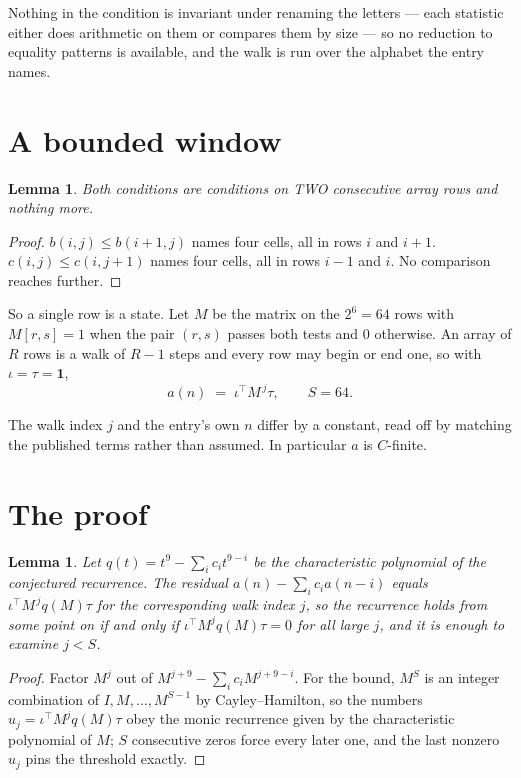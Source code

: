 \documentclass[11pt,a4paper]{article}
\theoremstyle{plain}
\newtheorem{lemma}[theorem]{Lemma}
\theoremstyle{definition}
\begin{document}
Nothing in the condition is invariant under renaming the letters --- each statistic either does
arithmetic on them or compares them by size --- so no reduction to equality patterns is
available, and the walk is run over the alphabet the entry names.

\section{A bounded window}

\begin{lemma}\label{lem:win}
Both conditions are conditions on TWO consecutive array rows and nothing more.
\end{lemma}

\begin{proof}
$b(i,j)\le b(i{+}1,j)$ names four cells, all in rows $i$ and $i+1$. $c(i,j)\le c(i,j{+}1)$
names four cells, all in rows $i-1$ and $i$. No comparison reaches further.
\end{proof}

So a single row is a state. Let $M$ be the matrix on the $2^{6}=64$ rows with
$M[r,s]=1$ when the pair $(r,s)$ passes both tests and $0$ otherwise. An array of $R$ rows is a
walk of $R-1$ steps and every row may begin or end one, so with $\iota=\tau=\mathbf{1}$,
\[
a(n)\;=\;\iota^{\!\top}M^{\,j}\tau ,\qquad S=64.
\]

The walk index $j$ and the entry's own $n$ differ by a constant, read off by matching the
published terms rather than assumed. In particular $a$ is $C$-finite.

\section{The proof}

\begin{lemma}\label{lem:crit}
Let $q(t)=t^{9}-\sum_i c_it^{9-i}$ be the characteristic polynomial of the
conjectured recurrence. The residual $a(n)-\sum_ic_ia(n-i)$ equals
$\iota^{\!\top}M^{\,j}q(M)\tau$ for the corresponding walk index $j$, so the recurrence
holds from some point on if and only if $\iota^{\!\top}M^{j}q(M)\tau=0$ for all large $j$,
and it is enough to examine $j<S$.
\end{lemma}

\begin{proof}
Factor $M^{j}$ out of $M^{j+9}-\sum_ic_iM^{j+9-i}$. For the bound, $M^{S}$
is an integer combination of $I,M,\dots,M^{S-1}$ by Cayley--Hamilton, so the numbers
$u_j=\iota^{\!\top}M^{j}q(M)\tau$ obey the monic recurrence given by the characteristic
polynomial of $M$; $S$ consecutive zeros force every later one, and the last nonzero $u_j$
pins the threshold exactly.
\end{proof}
\end{document}
